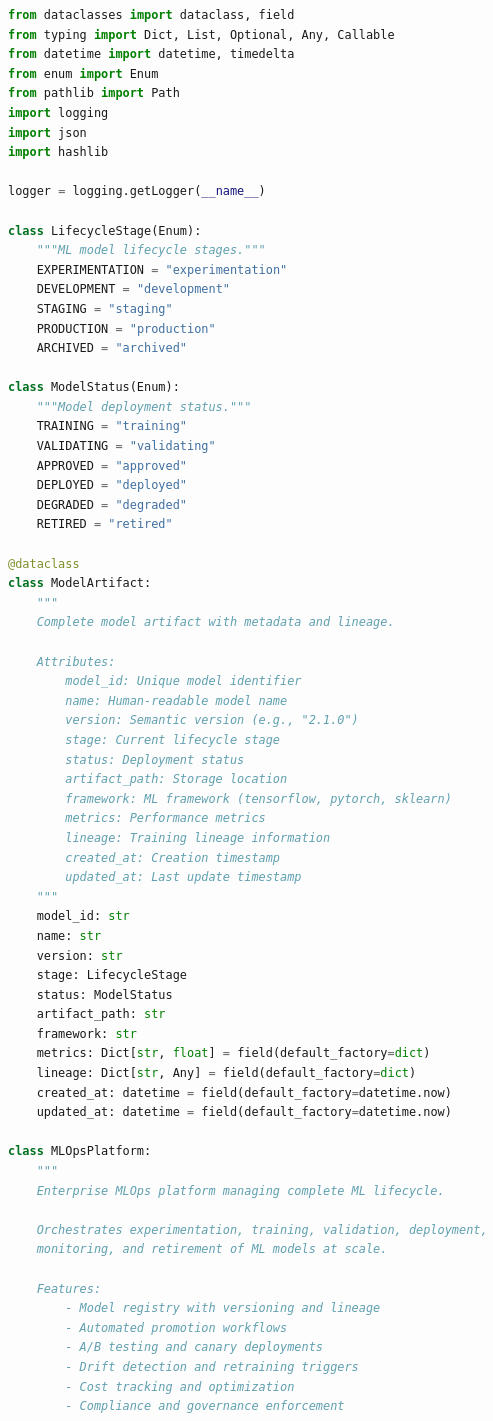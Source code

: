 \begin{lstlisting}[language=Python, caption={Enterprise MLOps Platform with Full Lifecycle Management}]
from dataclasses import dataclass, field
from typing import Dict, List, Optional, Any, Callable
from datetime import datetime, timedelta
from enum import Enum
from pathlib import Path
import logging
import json
import hashlib

logger = logging.getLogger(__name__)

class LifecycleStage(Enum):
    """ML model lifecycle stages."""
    EXPERIMENTATION = "experimentation"
    DEVELOPMENT = "development"
    STAGING = "staging"
    PRODUCTION = "production"
    ARCHIVED = "archived"

class ModelStatus(Enum):
    """Model deployment status."""
    TRAINING = "training"
    VALIDATING = "validating"
    APPROVED = "approved"
    DEPLOYED = "deployed"
    DEGRADED = "degraded"
    RETIRED = "retired"

@dataclass
class ModelArtifact:
    """
    Complete model artifact with metadata and lineage.

    Attributes:
        model_id: Unique model identifier
        name: Human-readable model name
        version: Semantic version (e.g., "2.1.0")
        stage: Current lifecycle stage
        status: Deployment status
        artifact_path: Storage location
        framework: ML framework (tensorflow, pytorch, sklearn)
        metrics: Performance metrics
        lineage: Training lineage information
        created_at: Creation timestamp
        updated_at: Last update timestamp
    """
    model_id: str
    name: str
    version: str
    stage: LifecycleStage
    status: ModelStatus
    artifact_path: str
    framework: str
    metrics: Dict[str, float] = field(default_factory=dict)
    lineage: Dict[str, Any] = field(default_factory=dict)
    created_at: datetime = field(default_factory=datetime.now)
    updated_at: datetime = field(default_factory=datetime.now)

class MLOpsPlatform:
    """
    Enterprise MLOps platform managing complete ML lifecycle.

    Orchestrates experimentation, training, validation, deployment,
    monitoring, and retirement of ML models at scale.

    Features:
        - Model registry with versioning and lineage
        - Automated promotion workflows
        - A/B testing and canary deployments
        - Drift detection and retraining triggers
        - Cost tracking and optimization
        - Compliance and governance enforcement


\end{lstlisting}
